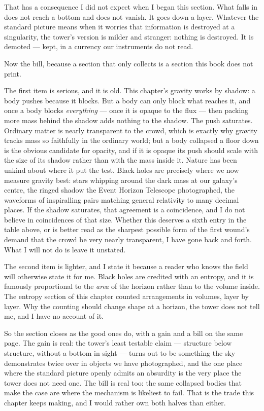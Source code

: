 That has a consequence I did not expect when I began this section. What falls in does not reach a bottom and does not vanish. It goes down a layer. Whatever the standard picture means when it worries that information is destroyed at a singularity, the tower's version is milder and stranger: nothing is destroyed. It is demoted --- kept, in a currency our instruments do not read.

Now the bill, because a section that only collects is a section this book does not print.

The first item is serious, and it is old. This chapter's gravity works by shadow: a body pushes because it blocks. But a body can only block what reaches it, and once a body blocks \emph{everything} --- once it is opaque to the flux --- then packing more mass behind the shadow adds nothing to the shadow. The push saturates. Ordinary matter is nearly transparent to the crowd, which is exactly why gravity tracks mass so faithfully in the ordinary world; but a body collapsed a floor down is the obvious candidate for opacity, and if it is opaque its push should scale with the size of its shadow rather than with the mass inside it. Nature has been unkind about where it put the test. Black holes are precisely where we now measure gravity best: stars whipping around the dark mass at our galaxy's centre, the ringed shadow the Event Horizon Telescope photographed, the waveforms of inspiralling pairs matching general relativity to many decimal places. If the shadow saturates, that agreement is a coincidence, and I do not believe in coincidences of that size. Whether this deserves a sixth entry in the table above, or is better read as the sharpest possible form of the first wound's demand that the crowd be very nearly transparent, I have gone back and forth. What I will not do is leave it unstated.

The second item is lighter, and I state it because a reader who knows the field will otherwise state it for me. Black holes are credited with an entropy, and it is famously proportional to the \emph{area} of the horizon rather than to the volume inside. The entropy section of this chapter counted arrangements in volumes, layer by layer. Why the counting should change shape at a horizon, the tower does not tell me, and I have no account of it.

So the section closes as the good ones do, with a gain and a bill on the same page. The gain is real: the tower's least testable claim --- structure below structure, without a bottom in sight --- turns out to be something the sky demonstrates twice over in objects we have photographed, and the one place where the standard picture openly admits an absurdity is the very place the tower does not need one. The bill is real too: the same collapsed bodies that make the case are where the mechanism is likeliest to fail. That is the trade this chapter keeps making, and I would rather own both halves than either.

